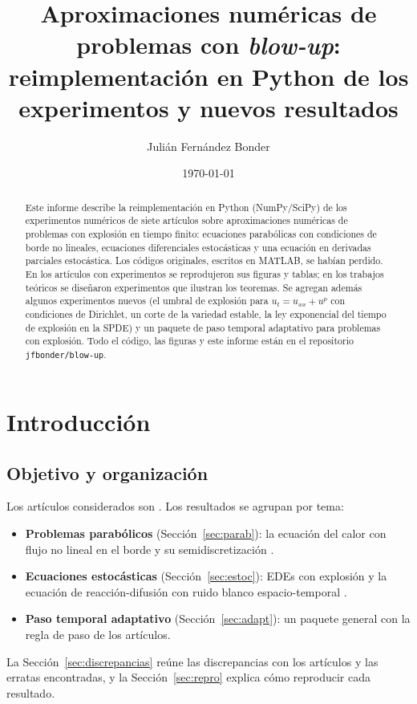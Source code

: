 \documentclass[11pt,a4paper]{article}
\title{Aproximaciones numéricas de problemas con \emph{blow-up}:\\
reimplementación en Python de los experimentos y nuevos resultados}
\author{Julián Fernández Bonder}
\date{\today}
\newcommand{\code}[1]{\texttt{#1}}
\begin{document}
\maketitle

\begin{abstract}
Este informe describe la reimplementación en Python (NumPy/SciPy) de los
experimentos numéricos de siete artículos sobre aproximaciones numéricas de
problemas con explosión en tiempo finito: ecuaciones parabólicas con
condiciones de borde no lineales, ecuaciones diferenciales estocásticas y una
ecuación en derivadas parciales estocástica. Los códigos originales, escritos
en MATLAB, se habían perdido. En los artículos con experimentos se
reprodujeron sus figuras y tablas; en los trabajos teóricos se diseñaron
experimentos que ilustran los teoremas. Se agregan además algunos
experimentos nuevos (el umbral de explosión para $u_t=u_{xx}+u^p$ con
condiciones de Dirichlet, un corte de la variedad estable, la ley
exponencial del tiempo de explosión en la SPDE) y un paquete de paso
temporal adaptativo para problemas con explosión. Todo el código, las
figuras y este informe están en el repositorio \code{jfbonder/blow-up}.
\end{abstract}

\tableofcontents

\section{Introducción}

\subsection{Objetivo y organización}

Los artículos considerados son \cite{AFR,FR,FGR,AFGR-dims,AFGR-sys,DFGRS,FG}.
Los resultados se agrupan por tema:
\begin{itemize}
\item \textbf{Problemas parabólicos} (Sección~\ref{sec:parab}): la ecuación
del calor con flujo no lineal en el borde y su semidiscretización
\cite{AFR,FR,FGR,AFGR-dims,AFGR-sys}.
\item \textbf{Ecuaciones estocásticas} (Sección~\ref{sec:estoc}): EDEs con
explosión \cite{DFGRS} y la ecuación de reacción-difusión con ruido blanco
espacio-temporal \cite{FG}.
\item \textbf{Paso temporal adaptativo} (Sección~\ref{sec:adapt}): un paquete
general con la regla de paso de los artículos.
\end{itemize}
La Sección~\ref{sec:discrepancias} reúne las discrepancias con los
artículos y las erratas encontradas, y la Sección~\ref{sec:repro} explica
cómo reproducir cada resultado.
\end{document}
